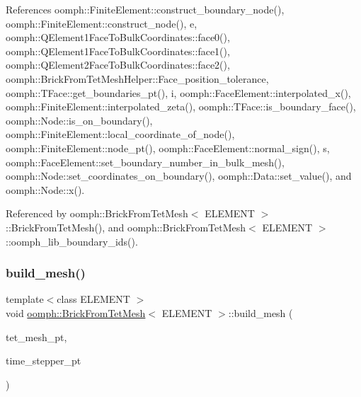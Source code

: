 References oomph\+::\+Finite\+Element\+::construct\+\_\+boundary\+\_\+node(), oomph\+::\+Finite\+Element\+::construct\+\_\+node(), e, oomph\+::\+Q\+Element1\+Face\+To\+Bulk\+Coordinates\+::face0(), oomph\+::\+Q\+Element1\+Face\+To\+Bulk\+Coordinates\+::face1(), oomph\+::\+Q\+Element2\+Face\+To\+Bulk\+Coordinates\+::face2(), oomph\+::\+Brick\+From\+Tet\+Mesh\+Helper\+::\+Face\+\_\+position\+\_\+tolerance, oomph\+::\+T\+Face\+::get\+\_\+boundaries\+\_\+pt(), i, oomph\+::\+Face\+Element\+::interpolated\+\_\+x(), oomph\+::\+Finite\+Element\+::interpolated\+\_\+zeta(), oomph\+::\+T\+Face\+::is\+\_\+boundary\+\_\+face(), oomph\+::\+Node\+::is\+\_\+on\+\_\+boundary(), oomph\+::\+Finite\+Element\+::local\+\_\+coordinate\+\_\+of\+\_\+node(), oomph\+::\+Finite\+Element\+::node\+\_\+pt(), oomph\+::\+Face\+Element\+::normal\+\_\+sign(), s, oomph\+::\+Face\+Element\+::set\+\_\+boundary\+\_\+number\+\_\+in\+\_\+bulk\+\_\+mesh(), oomph\+::\+Node\+::set\+\_\+coordinates\+\_\+on\+\_\+boundary(), oomph\+::\+Data\+::set\+\_\+value(), and oomph\+::\+Node\+::x().



Referenced by oomph\+::\+Brick\+From\+Tet\+Mesh$<$ E\+L\+E\+M\+E\+N\+T $>$\+::\+Brick\+From\+Tet\+Mesh(), and oomph\+::\+Brick\+From\+Tet\+Mesh$<$ E\+L\+E\+M\+E\+N\+T $>$\+::oomph\+\_\+lib\+\_\+boundary\+\_\+ids().

\mbox{\label{classoomph_1_1BrickFromTetMesh_afd36d1606f796e926c61b1112b3b6117}} 
\subsubsection{\texorpdfstring{build\+\_\+mesh()}{build\_mesh()}\hspace{0.1cm}{\footnotesize\ttfamily [2/2]}}
{\footnotesize\ttfamily template$<$class E\+L\+E\+M\+E\+NT $>$ \\
void \hyperlink{classoomph_1_1BrickFromTetMesh}{oomph\+::\+Brick\+From\+Tet\+Mesh}$<$ E\+L\+E\+M\+E\+NT $>$\+::build\+\_\+mesh (\begin{DoxyParamCaption}\item[{\hyperlink{classoomph_1_1TetgenMesh}{Tetgen\+Mesh}$<$ \hyperlink{classoomph_1_1TElement}{T\+Element}$<$ 3, 3 $>$ $>$ $\ast$}]{tet\+\_\+mesh\+\_\+pt,  }\item[{\hyperlink{classoomph_1_1TimeStepper}{Time\+Stepper} $\ast$}]{time\+\_\+stepper\+\_\+pt }\end{DoxyParamCaption})\hspace{0.3cm}{\ttfamily [private]}}



